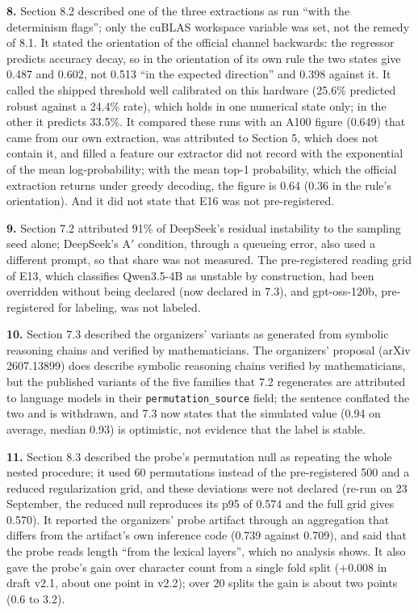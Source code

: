 \noindent\textbf{8.} Section 8.2 described one of the three extractions as run ``with the determinism flags''; only the cuBLAS workspace variable was set, not the remedy of 8.1. It stated the orientation of the official channel backwards: the regressor predicts accuracy decay, so in the orientation of its own rule the two states give 0.487 and 0.602, not 0.513 ``in the expected direction'' and 0.398 against it. It called the shipped threshold well calibrated on this hardware (25.6\% predicted robust against a 24.4\% rate), which holds in one numerical state only; in the other it predicts 33.5\%. It compared these runs with an A100 figure (0.649) that came from our own extraction, was attributed to Section 5, which does not contain it, and filled a feature our extractor did not record with the exponential of the mean log-probability; with the mean top-1 probability, which the official extraction returns under greedy decoding, the figure is 0.64 (0.36 in the rule's orientation). And it did not state that E16 was not pre-registered.
\par

\noindent\textbf{9.} Section 7.2 attributed 91\% of DeepSeek's residual instability to the sampling seed alone; DeepSeek's A$'$ condition, through a queueing error, also used a different prompt, so that share was not measured. The pre-registered reading grid of E13, which classifies Qwen3.5-4B as unstable by construction, had been overridden without being declared (now declared in 7.3), and gpt-oss-120b, pre-registered for labeling, was not labeled.
\par

\noindent\textbf{10.} Section 7.3 described the organizers' variants as generated from symbolic reasoning chains and verified by mathematicians. The organizers' proposal (arXiv 2607.13899) does describe symbolic reasoning chains verified by mathematicians, but the published variants of the five families that 7.2 regenerates are attributed to language models in their \texttt{permutation\_source} field; the sentence conflated the two and is withdrawn, and 7.3 now states that the simulated value (0.94 on average, median 0.93) is optimistic, not evidence that the label is stable.
\par

\noindent\textbf{11.} Section 8.3 described the probe's permutation null as repeating the whole nested procedure; it used 60 permutations instead of the pre-registered 500 and a reduced regularization grid, and these deviations were not declared (re-run on 23 September, the reduced null reproduces its p95 of 0.574 and the full grid gives 0.570). It reported the organizers' probe artifact through an aggregation that differs from the artifact's own inference code (0.739 against 0.709), and said that the probe reads length ``from the lexical layers'', which no analysis shows. It also gave the probe's gain over character count from a single fold split (+0.008 in draft v2.1, about one point in v2.2); over 20 splits the gain is about two points (0.6 to 3.2).
\par

